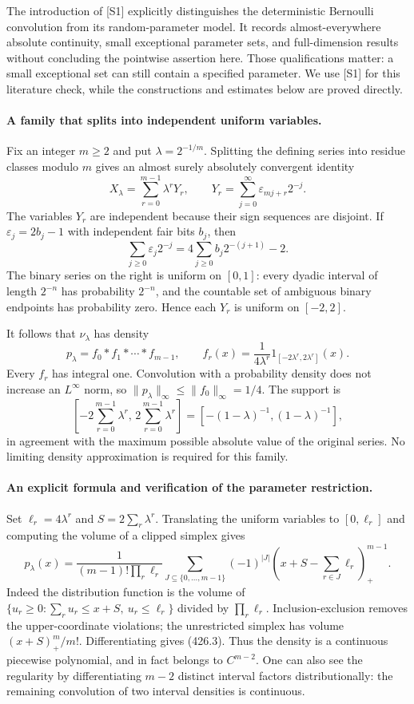 \documentclass[11pt]{article}
\begin{document}
The introduction of [S1] explicitly distinguishes the deterministic Bernoulli convolution from its random-parameter model. It records almost-everywhere absolute continuity, small exceptional parameter sets, and full-dimension results without concluding the pointwise assertion here. Those qualifications matter: a small exceptional set can still contain a specified parameter. We use [S1] for this literature check, while the constructions and estimates below are proved directly.

\paragraph{A family that splits into independent uniform variables.}
Fix an integer $m\ge2$ and put $\lambda=2^{-1/m}$. Splitting the defining series into residue classes modulo $m$ gives an almost surely absolutely convergent identity
\[
 X_\lambda=\sum_{r=0}^{m-1}\lambda^rY_r,
 \qquad Y_r=\sum_{j=0}^{\infty}\varepsilon_{mj+r}2^{-j}.
 \tag{426.1}
\]
The variables $Y_r$ are independent because their sign sequences are disjoint. If $\varepsilon_j=2b_j-1$ with independent fair bits $b_j$, then
\[
 \sum_{j\ge0}\varepsilon_j2^{-j}
 =4\sum_{j\ge0}b_j2^{-(j+1)}-2.
\]
The binary series on the right is uniform on $[0,1]$: every dyadic interval of length $2^{-n}$ has probability $2^{-n}$, and the countable set of ambiguous binary endpoints has probability zero. Hence each $Y_r$ is uniform on $[-2,2]$.

It follows that $\nu_\lambda$ has density
\[
 p_\lambda=f_0*f_1*\cdots*f_{m-1},\qquad
 f_r(x)=\frac{1}{4\lambda^r}1_{[-2\lambda^r,2\lambda^r]}(x).
 \tag{426.2}
\]
Every $f_r$ has integral one. Convolution with a probability density does not increase an $L^\infty$ norm, so $\|p_\lambda\|_\infty\le\|f_0\|_\infty=1/4$. The support is
\[
 \left[-2\sum_{r=0}^{m-1}\lambda^r,\,
        2\sum_{r=0}^{m-1}\lambda^r\right]
 =[-(1-\lambda)^{-1},(1-\lambda)^{-1}],
\]
in agreement with the maximum possible absolute value of the original series. No limiting density approximation is required for this family.

\paragraph{An explicit formula and verification of the parameter restriction.}
Set $\ell_r=4\lambda^r$ and $S=2\sum_r\lambda^r$. Translating the uniform variables to $[0,\ell_r]$ and computing the volume of a clipped simplex gives
\[
 p_\lambda(x)=\frac{1}{(m-1)!\prod_r\ell_r}
 \sum_{J\subseteq\{0,\ldots,m-1\}}(-1)^{|J|}
       \left(x+S-\sum_{r\in J}\ell_r\right)_+^{m-1}.
 \tag{426.3}
\]
Indeed the distribution function is the volume of $\{u_r\ge0:\sum_ru_r\le x+S,\ u_r\le\ell_r\}$ divided by $\prod_r\ell_r$. Inclusion-exclusion removes the upper-coordinate violations; the unrestricted simplex has volume $(x+S)_+^m/m!$. Differentiating gives (426.3). Thus the density is a continuous piecewise polynomial, and in fact belongs to $C^{m-2}$. One can also see the regularity by differentiating $m-2$ distinct interval factors distributionally: the remaining convolution of two interval densities is continuous.
\end{document}
